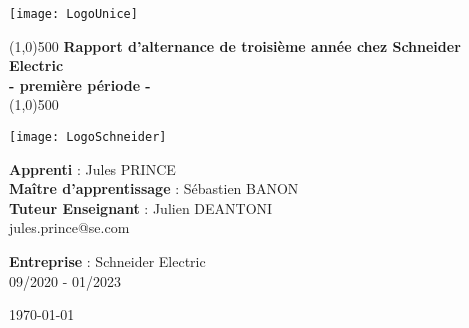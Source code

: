\documentclass[11pt]{article}
\begin{document}

    \begin{titlepage}
        \begin{sffamily}
            \begin{center}

                \texttt{[image: LogoUnice]}~\\[1.5cm]

                \begin{center}
                    \line(1,0){500}
                    { \huge \bfseries Rapport d'alternance de troisième année chez Schneider Electric \\ {\small - première période -} \\[0.4cm] }
                    \line(1,0){500}

                    \vspace*{15mm}
                    \texttt{[image: LogoSchneider]}

                    \vspace*{29mm}
                    \textbf{Apprenti} : Jules PRINCE
                    \\\textbf{Maître d’apprentissage} : Sébastien BANON
                    \\\textbf{Tuteur Enseignant} : Julien DEANTONI
                    \\jules.prince@se.com

                    \vspace*{8mm}

                    \textbf{Entreprise} : Schneider Electric
                    \\09/2020 - 01/2023
                \end{center}

                \vfill
                \today

            \end{center}
        \end{sffamily}
    \end{titlepage}

    \setcounter{page}{2}
\end{document}
